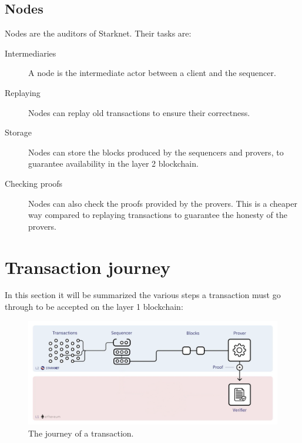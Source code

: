 \documentclass[12pt]{article}
\begin{document}
\subsection{Nodes} \label{subsection:nodes}
Nodes are the auditors of Starknet. Their tasks are:
\begin{description}
    \item[Intermediaries] A node is the intermediate actor between a client and the sequencer.
    \item[Replaying] Nodes can replay old transactions to ensure their correctness. 
    \item[Storage] Nodes can store the blocks produced by the sequencers and provers, to guarantee availability in the layer 2 blockchain.
    \item[Checking proofs] Nodes can also check the proofs provided by the provers. This is a cheaper way compared to replaying transactions to guarantee the honesty of the provers.  
\end{description}

\section{Transaction journey} \label{section:transaction_journey}
In this section it will be summarized the various steps a transaction must go through to be accepted on the layer 1 blockchain:

\begin{figure}[h]
    \centering
    \includegraphics[width=\textwidth]{l2_transaction_journey} 
    \caption{The journey of a transaction.}
    \label{figure:transaction_journey}
\end{figure}
\end{document}
